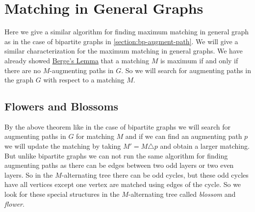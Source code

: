 \chapter{Matching in General Graphs}
Here we give a similar algorithm for finding maximum matching in general graph as in the case of bipartite graphs in \autoref{section:bp-augment-path}. We will give a similar characterization for the maximum matching in general graphs. We have already showed \hyperref[th:bergesthm]{Berge's Lemma} that a matching $M$ is maximum if and only if there are no $M$-augmenting paths in $G$. So we will search for augmenting paths in the graph $G$ with respect to a matching $M$.
\section{Flowers and Blossoms}
By the above theorem like in the case of bipartite graphs we will search for augmenting paths in $G$ for matching $M$ and if we can find an augmenting path $p$ we will update the matching by taking $M'=M\triangle p$ and obtain a larger matching. But unlike bipartite graphs we can not run the same algorithm for finding augmenting paths as there can be edges between two odd layers or two even layers. So in the $M$-alternating tree there can be odd cycles, but these odd cycles have all vertices except one vertex are matched using edges of the cycle. So we look for these special structures in the $M$-alternating tree called \emph{blossom} and \emph{flower}.
